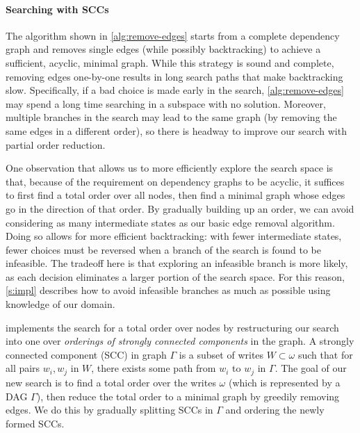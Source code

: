 \paragraph{Searching with SCCs}
The algorithm shown in \autoref{alg:remove-edges} starts from a complete dependency graph and removes single
edges (while possibly backtracking) to achieve a sufficient, acyclic, minimal graph. While this strategy
is sound and complete, removing edges one-by-one results in long search paths that make backtracking slow.
Specifically, if a bad choice is made early in the search, \autoref{alg:remove-edges} may spend a long time
searching in a subspace with no solution. Moreover, multiple branches in the search may lead to the same graph
(by removing the same edges in a different order), so there is headway to improve our search
with partial order reduction.

One observation that allows us to more efficiently explore the search space is that,
because of the requirement on dependency graphs to be acyclic, it suffices to first
find a total order over all nodes, then find a minimal graph whose edges go in the
direction of that order. By gradually building up an order, we can avoid considering
as many intermediate states as our basic edge removal algorithm.
Doing so allows for more efficient backtracking: with fewer intermediate states,
fewer choices must be reversed when a branch of the search is found to be infeasible.
The tradeoff here is that exploring an infeasible branch is more likely,
as each decision eliminates a larger portion of the search space.
For this reason, \autoref{s:impl} describes how to avoid infeasible branches
as much as possible using knowledge of our domain.

\depsynth implements the search for a total order over nodes
by restructuring our search into one over \textit{orderings of
strongly connected components} in the graph. A strongly connected component (SCC) in graph $\Gamma$ is a subset of
writes $W\subset \omega$ such that for all pairs $w_i,w_j$ in $W$, there exists some path from $w_i$ to $w_j$
in $\Gamma$. The goal of our new search is to find a total order over the writes $\omega$ (which is represented
by a DAG $\Gamma$), then reduce the total order to a minimal graph by greedily removing edges.
We do this by gradually splitting SCCs in $\Gamma$ and ordering the newly formed SCCs.

